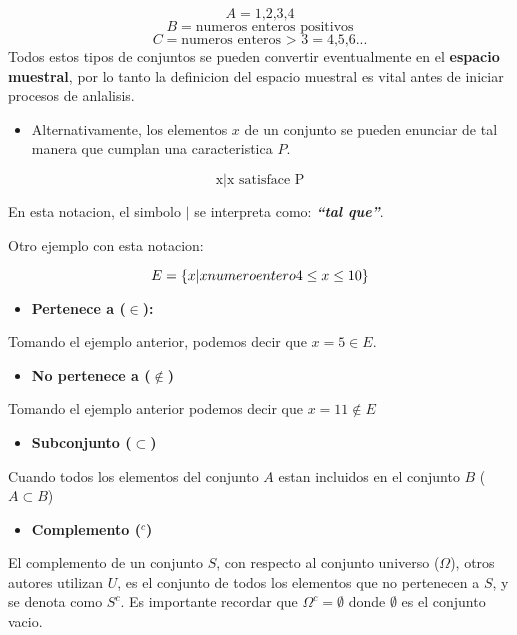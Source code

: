 \documentclass[]{book}
\providecommand{\tightlist}{%
  \setlength{\itemsep}{0pt}\setlength{\parskip}{0pt}}
\begin{document}
\[A=\text{{1,2,3,4}}\] \[B = \text{{numeros enteros positivos}}\]
\[ C = \text{{numeros enteros > 3}} = \text{{4,5,6...}}\] Todos estos
tipos de conjuntos se pueden convertir eventualmente en el
\textbf{espacio muestral}, por lo tanto la definicion del espacio
muestral es vital antes de iniciar procesos de anlalisis.

\begin{itemize}
\tightlist
\item
  Alternativamente, los elementos \(x\) de un conjunto se pueden
  enunciar de tal manera que cumplan una caracteristica \(P\).
\end{itemize}

\[\text{{x|x satisface P}}\]

En esta notacion, el simbolo \emph{\(|\)} se interpreta como:
\textbf{\emph{``tal que''}}.

Otro ejemplo con esta notacion:

\[ E = \{x|x \space numero\space entero\space 4 \leq x \leq 10\}\]

\begin{itemize}
\tightlist
\item
  \textbf{Pertenece a (\(\in\)):}
\end{itemize}

Tomando el ejemplo anterior, podemos decir que \(x = 5 \in E\).

\begin{itemize}
\tightlist
\item
  \textbf{No pertenece a (\(\notin\))}
\end{itemize}

Tomando el ejemplo anterior podemos decir que \(x = 11 \notin E\)

\begin{itemize}
\tightlist
\item
  \textbf{Subconjunto (\(\subset\))}
\end{itemize}

Cuando todos los elementos del conjunto \(A\) estan incluidos en el
conjunto \(B\) (\(A \subset B\))

\begin{itemize}
\tightlist
\item
  \textbf{Complemento (\(^c\))}
\end{itemize}

El complemento de un conjunto \(S\), con respecto al conjunto universo
(\(\Omega\)), otros autores utilizan \(U\), es el conjunto de todos los
elementos que no pertenecen a \(S\), y se denota como \(S^c\). Es
importante recordar que \(\Omega^c = \emptyset\) donde \(\emptyset\) es
el conjunto vacio.
\end{document}
